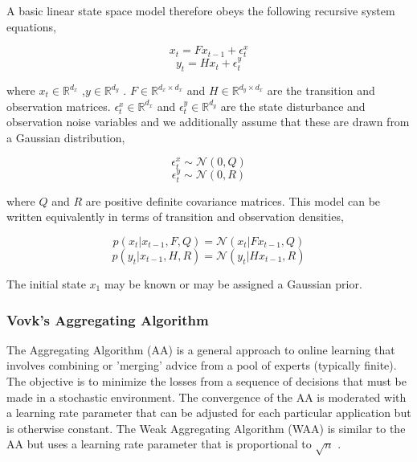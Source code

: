 \documentclass{acm_proc_article-sp}
\begin{document}
A basic linear state space model therefore obeys the following
recursive system equations,

\begin{equation}
x_t = Fx_{t-1} + \epsilon_t^x
\end{equation}
\begin{equation}
y_t = Hx_t + \epsilon_t^y
\end{equation}

where $x_t \in \mathbb{R}^{d_x}$ ,$y \in \mathbb{R}^{d_y}$ . $F \in \mathbb{R}^{d_x \times d_x}$ and $H \in \mathbb{R}^{d_y \times d_x}$ are
the transition and observation matrices. $\epsilon_t^x \in \mathbb{R}^{d_x}$ and $\epsilon_t^y \in \mathbb{R}^{d_y}$ 
are the state disturbance and observation noise variables and
we additionally assume that these are drawn from a Gaussian
distribution,

\begin{equation}
\epsilon_t^x \sim \mathcal{N}(0, Q)
\end{equation}
\begin{equation}
\epsilon_t^y \sim \mathcal{N}(0, R)
\end{equation}

where $Q$ and $R$ are positive definite covariance matrices. This
model can be written equivalently in terms of transition and
observation densities,

\begin{equation}
p(x_t|x_{t−1},F,Q)= \mathcal{N}(x_t|Fx_{t−1} ,Q)
\end{equation}
\begin{equation}
p(y_t|x_{t−1},H,R)= \mathcal{N}(y_t|Hx_{t−1} ,R)
\end{equation}


The initial state $x_1$ may be known or may be assigned a Gaussian prior.


\subsubsection{Vovk's Aggregating Algorithm}

The Aggregating Algorithm (AA) \cite{INSR:INSR213} is a general approach
to online learning that involves combining or 'merging' advice
from a pool of experts (typically finite). The objective is to
minimize the losses from a sequence of decisions that must be
made in a stochastic environment. The convergence of the AA is
moderated with a learning rate parameter that can be adjusted for
each particular application but is otherwise constant. The Weak
Aggregating Algorithm (WAA) is similar to the AA but uses a
learning rate parameter that is proportional to $\sqrt{n}$ \cite{Levina2010516}.
\end{document}
